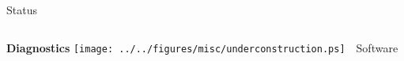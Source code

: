 \documentclass[compress,red]{beamer}
\begin{document}
\begin{frame}{Status}
\begin{columns}[c]
    \begin{block}{  {\bf Diagnostics}}
      \texttt{[image: ../../figures/misc/underconstruction.ps]}~~Software
    \end{block}

  \end{columns}


% 
% 
% 
% 
% 
% 
% 
% 
\end{frame}
\end{document}
